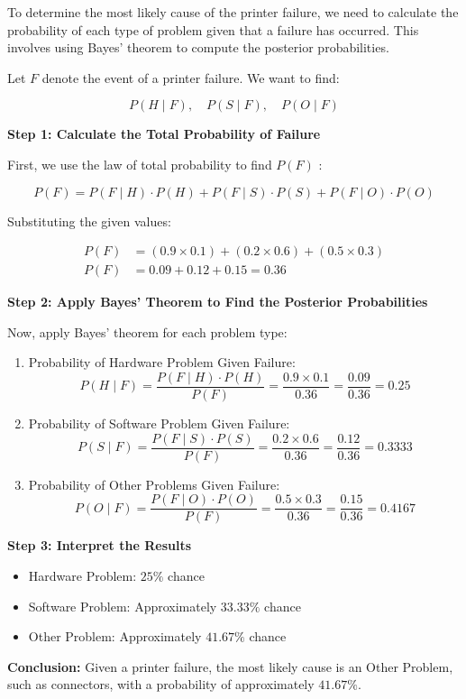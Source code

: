 \begin{solution}
    To determine the most likely cause of the printer failure, we need to calculate the probability of each type of problem given that a failure has occurred. This involves using Bayes' theorem to compute the posterior probabilities.

Let $F$ denote the event of a printer failure. We want to find:

\[
P(H \mid F), \quad P(S \mid F), \quad P(O \mid F)
\]

\textbf{Step 1: Calculate the Total Probability of Failure
}

First, we use the law of total probability to find $P(F)$ :

\[
P(F) = P(F \mid H) \cdot P(H) + P(F \mid S) \cdot P(S) + P(F \mid O) \cdot P(O)
\]

Substituting the given values:

\[
\begin{aligned}
P(F) &= (0.9 \times 0.1) + (0.2 \times 0.6) + (0.5 \times 0.3) \\
P(F) &= 0.09 + 0.12 + 0.15 = 0.36
\end{aligned}
\]

\textbf{Step 2: Apply Bayes' Theorem to Find the Posterior Probabilities
}

Now, apply Bayes' theorem for each problem type:

\begin{enumerate}
    \item Probability of Hardware Problem Given Failure:
    \[
    P(H \mid F)=\frac{P(F \mid H) \cdot P(H)}{P(F)}=\frac{0.9 \times 0.1}{0.36}=\frac{0.09}{0.36}=0.25
    \]

    \item Probability of Software Problem Given Failure:
    \[
    P(S \mid F)=\frac{P(F \mid S) \cdot P(S)}{P(F)}=\frac{0.2 \times 0.6}{0.36}=\frac{0.12}{0.36}=0.3333
    \]

    \item Probability of Other Problems Given Failure:
    \[
    P(O \mid F)=\frac{P(F \mid O) \cdot P(O)}{P(F)}=\frac{0.5 \times 0.3}{0.36}=\frac{0.15}{0.36}=0.4167
    \]
\end{enumerate}

\textbf{Step 3: Interpret the Results}
\begin{itemize}
    \item Hardware Problem: $25 \%$ chance
    \item Software Problem: Approximately $33.33 \%$ chance
    \item Other Problem: Approximately $41.67 \%$ chance
\end{itemize}

\textbf{Conclusion:} Given a printer failure, the most likely cause is an Other Problem, such as connectors, with a probability of approximately $41.67 \%$.


\end{solution}